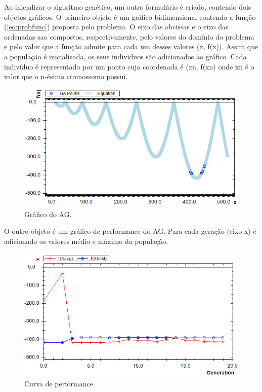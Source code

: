 \documentclass[twoside]{article}
\begin{document}
\begin{multicols}{2}
Ao inicializar o algoritmo genético, um outro formulário é criado, contendo dois objetos gráficos. O primeiro objeto é um gráfico bidimensional contendo a função (\ref{eq:probfunc}) proposta pelo problema. O eixo das abcissas e o eixo das ordenadas sao compostos, respectivamente, pelo valores do domínio do problema e pelo valor que a função admite para cada um desses valores (x, f(x)). Assim que a população é inicializada, os seus individuos são adicionados ao gráfico. Cada indivíduo é representado por um ponto cuja coordenada é (xn, f(xn) onde xn é o valor que o n-ésimo cromossomo possui. 

\begin{figure}[H]
\label{fig:graphicview}
  \caption{Gráfico do AG.}
  \centering
    \includegraphics[scale = 0.47]{genetic_algorithm_plot.png}
\end{figure}

O outro objeto é um gráfico de performance do AG. Para cada geração (eixo x) é adicionado os valores médio e máximo da população.

\begin{figure}[H]
\label{fig:graphicview}
  \caption{Curva de performance.}
  \centering
    \includegraphics[scale = 0.47]{performance_curve.png}
\end{figure}


\end{multicols}
\end{document}

